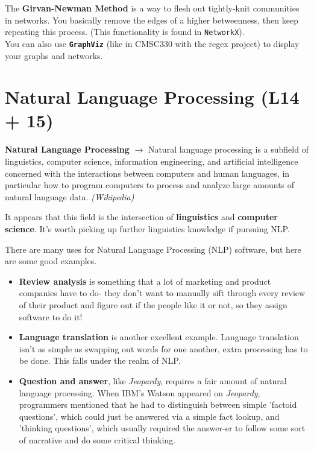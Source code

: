 \documentclass[english, 10pt]{article}
\begin{document}
\hfill \break The \textbf{Girvan-Newman Method} is a way to flesh out tightly-knit communities in networks. You basically remove the edges of a higher betweenness, then keep repeating this process. (This functionality is found in \texttt{NetworkX}).\\

You can also use \textbf{\texttt{GraphViz}} (like in CMSC330 with the regex project) to display your graphs and networks.\\

\section{Natural Language Processing (L14 + 15)}

\begin{tcolorbox}[title=Definition:,colframe=red!75!black,colback=red!5!white,arc=0pt,fonttitle=\bfseries]
\textbf{Natural Language Processing} $\rightarrow$ Natural language processing is a subfield of linguistics, computer science, information engineering, and artificial intelligence concerned with the interactions between computers and human languages, in particular how to program computers to process and analyze large amounts of natural language data. \textit{(Wikipedia)}
\end{tcolorbox}

\hfill \break It appears that this field is the intersection of \textbf{linguistics} and \textbf{computer science}. It's worth picking up further linguistics knowledge if pursuing NLP.

\hfill \break There are many uses for Natural Language Processing (NLP) software, but here are some good examples.

\begin{itemize}
	\item \textbf{Review analysis} is something that a lot of marketing and product companies have to do- they don't want to manually sift through every review of their product and figure out if the people like it or not, so they assign software to do it!
	\item \textbf{Language translation} is another excellent example. Language translation isn't as simple as swapping out words for one another, extra processing has to be done. This falls under the realm of NLP.
	\item \textbf{Question and answer}, like \textit{Jeopardy}, requires a fair amount of natural language processing. When IBM's Watson appeared on \textit{Jeopardy}, programmers mentioned that he had to distinguish between simple 'factoid questions', which could just be answered via a simple fact lookup, and 'thinking questions', which usually required the answer-er to follow some sort of narrative and do some critical thinking.
\end{itemize}
\end{document}
